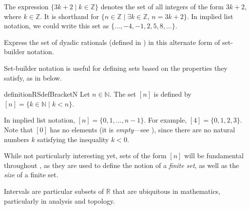 \begin{example}
The expression $\{ 3k+2 \mid k \in \mathbb{Z} \}$ denotes the set of all integers of the form $3k+2$, where $k \in \mathbb{Z}$. It is shorthand for $\{ n \in \mathbb{Z} \mid \exists k \in \mathbb{Z},\, n=3k+2 \}$. In implied list notation, we could write this set as $\{ \dots, {-4}, {-1}, 2, 5, 8, \dots \}$.
\end{example}

\begin{exercise}
Express the set of dyadic rationals (defined in ) in this alternate form of set-builder notation.
\end{exercise}

Set-builder notation is useful for defining sets based on the properties they satisfy, as in  below.

\begin{restatable}{definition}{RSdefBracketN}
\label{defBracketN}
Let $n \in \mathbb{N}$. The set $[n]$ is defined by $[n] = \{ k \in \mathbb{N} \mid k < n \}$.
\end{restatable}

\begin{example}
\label{exBracketN}
In implied list notation, $[n] = \{ 0, 1, \dots, n-1 \}$. For example, $[4] = \{ 0, 1, 2, 3 \}$. Note that $[0]$ has no elements (it is \textit{empty}---see ), since there are no natural numbers $k$ satisfying the inequality $k < 0$.
\end{example}

While not particularly interesting yet, sets of the form $[n]$ will be fundamental throughout , as they are used to define the notion of a \textit{finite set}, as well as the \textit{size} of a finite set.

Intervals are particular subsets of $\mathbb{R}$ that are ubiquitous in mathematics, particularly in analysis and topology.

